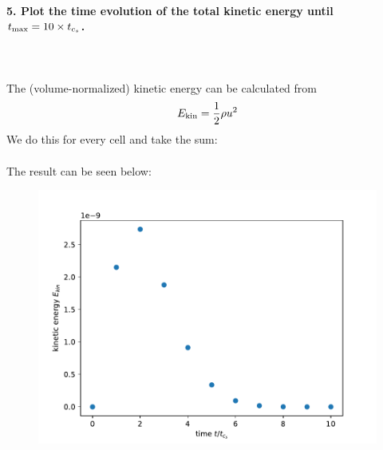 \paragraph{5. Plot the time evolution of the total kinetic 
    energy until $t_\textnormal{max}=10\times t_{c_s}$.
} \ \\  
    \\
    The (volume-normalized) kinetic energy can be 
    calculated from 
    \begin{equation}
        E_\textnormal{kin}=\frac{1}{2}\rho u^2
    \end{equation}
    We do this for every cell and take the sum: \\
     \ \\
    The result can be seen below:
    \begin{figure}[h!]
        \centering
        \includegraphics[width=.7\textwidth]{../figures/energy_evolution.pdf}
    \end{figure} \ \\ 
